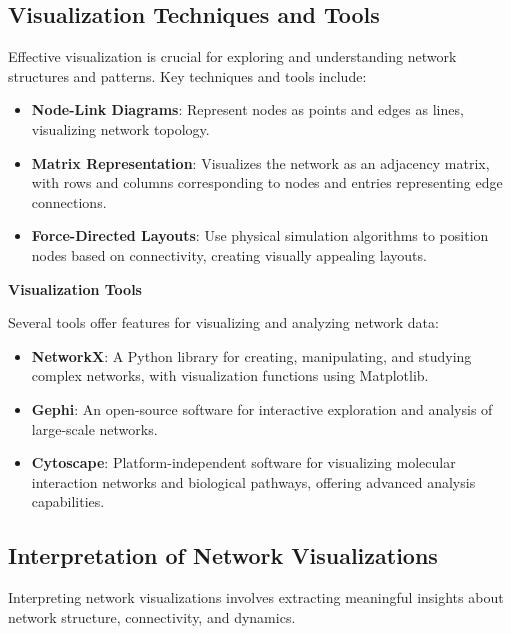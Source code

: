 \documentclass[12pt]{book} %
\begin{document}
\subsection{Visualization Techniques and Tools}

Effective visualization is crucial for exploring and understanding network structures and patterns. Key techniques and tools include:

\begin{itemize}
    \item \textbf{Node-Link Diagrams}: Represent nodes as points and edges as lines, visualizing network topology.
    
    \item \textbf{Matrix Representation}: Visualizes the network as an adjacency matrix, with rows and columns corresponding to nodes and entries representing edge connections.
    
    \item \textbf{Force-Directed Layouts}: Use physical simulation algorithms to position nodes based on connectivity, creating visually appealing layouts.
\end{itemize}

\textbf{Visualization Tools}

Several tools offer features for visualizing and analyzing network data:

\begin{itemize}
    \item \textbf{NetworkX}: A Python library for creating, manipulating, and studying complex networks, with visualization functions using Matplotlib.
    
    \item \textbf{Gephi}: An open-source software for interactive exploration and analysis of large-scale networks.
    
    \item \textbf{Cytoscape}: Platform-independent software for visualizing molecular interaction networks and biological pathways, offering advanced analysis capabilities.
\end{itemize}

\subsection{Interpretation of Network Visualizations}

Interpreting network visualizations involves extracting meaningful insights about network structure, connectivity, and dynamics.
\end{document}
